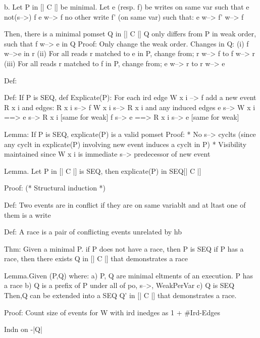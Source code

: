   b. Let P in [| C |] be minimal. 
     Let e (resp. f) be writes on same var such that 
               e not(s-->) f
               e w--> f
               no other write f' (on same var) such that:
                      e w--> f' w--> f

     Then, there is a minimal pomset Q in [| C |] 
           Q only differs from P in weak order, such that 
                f w--> e 
           in Q
    Proof: Only change the weak order.
         Changes in Q:
           (i)      f w-->e in r     
          (ii)  For all reads r matched to e in P, change from;
                    r w--> f to f w--> r
         (iii) For all reads r matched to f in P, change from;           
                    e w--> r to r w--> e

                    
Def: 

Def: If P is SEQ, def Explicate(P):
For each ird edge
      W x i --> f
add a new event R x i and edges:
      R x i s--> f
      W x i s--> R x i
and any induced edges
   e s--> W x i  ==> e s--> R x i  [same for weak]
   f s--> e      ==> R x i s--> e  [same for weak]
  
Lemma:
   If P is SEQ, explicate(P) is a valid pomset
Proof:
      * No s--> cyclts (since any cyclt in explicate(P) involving new event induces a cyclt in P)
      * Visibility maintained since W x i is immediate s--> predecessor of new event

Lemma.  Let P in [| C |] is SEQ,  then explicate(P) in SEQ[| C |]

Proof: (* Structural induction *)
  

Def: Two events are in conflict if they are on same variablt and at ltast one of them is a write 

Def: A race is a pair of conflicting events unrelated by hb
 

  
Thm:
Given a minimal P.
    if P does not have a race, then P is SEQ
    if P has a race, then there exists Q in [| C |] that demonstrates a race

Lemma.Given (P,Q) where:
          a) P, Q are minimal eltments of an execution.  P has a race
          b) Q is a prefix of P under all of po, s-->, WeakPerVar
          c) Q is SEQ
    Then,Q can be extended into a SEQ Q' in [| C |] that demonstrates a race.
          
Proof:    
Count size of events for W with ird inedges as 1 + #Ird-Edges 

Indn on -|Q|




